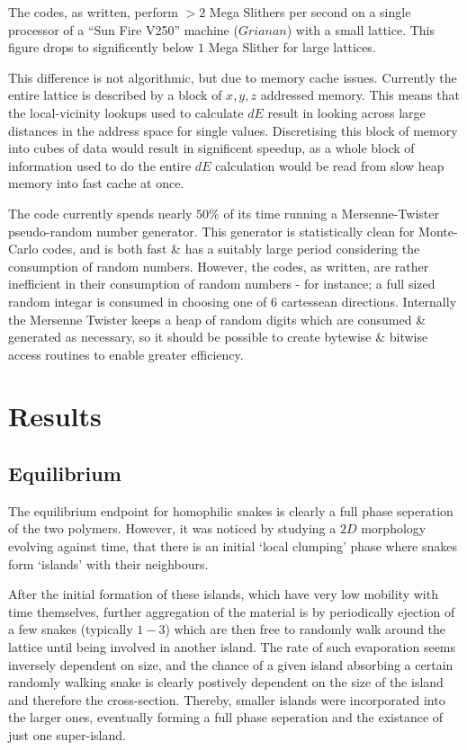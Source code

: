 \documentclass[twocolumn,a4,notitlepage]{report}
\begin{document}
The codes, as written, perform $>2$ Mega Slithers per second on a single
processor of a ``Sun Fire V250'' machine ($Grianan$) with a small lattice.
This figure drops to significently below $1$ Mega Slither for large lattices.

This difference is not algorithmic, but due to memory cache issues.
Currently the entire lattice is described by a block of $x,y,z$ addressed
memory. This means that the local-vicinity lookups used to calculate $dE$
result in looking across large distances in the address space for single values.
Discretising this block of memory into cubes of data would result in
significent speedup, as a whole block of information used to do the entire
$dE$ calculation would be read from slow heap memory into fast cache at
once.

The code currently spends nearly $50\%$ of its time running a
Mersenne-Twister pseudo-random number generator. This generator is
statistically clean for Monte-Carlo codes, and is both fast \& has a
suitably large period considering the consumption of random numbers.
However, the codes, as written, are rather inefficient in their consumption
of random numbers - for instance; a full sized random integar is consumed in
choosing one of 6 cartessean directions. Internally the Mersenne Twister
keeps a heap of random digits which are consumed \& generated as necessary,
so it should be possible to create bytewise \& bitwise access routines
to enable greater efficiency.

\section{Results}

\subsection{Equilibrium}

The equilibrium endpoint for homophilic snakes is clearly a full phase
seperation of the two polymers. However, it was noticed by studying a $2D$
morphology evolving against time, that there is an initial `local clumping'
phase where snakes form `islands' with their neighbours.

After the initial
formation of these islands, which have very low mobility with time themselves,
further aggregation of the material is by
periodically ejection of a few snakes (typically $1-3$) which are then free
to randomly walk around the lattice until being involved in another island.
The rate of such evaporation seems inversely dependent on size, and the
chance of a given island absorbing a certain randomly walking snake is
clearly postively dependent on the size of the island and therefore the
cross-section. Thereby, smaller islands were incorporated into the larger
ones, eventually forming a full phase seperation and the existance of just
one super-island.
\end{document}
